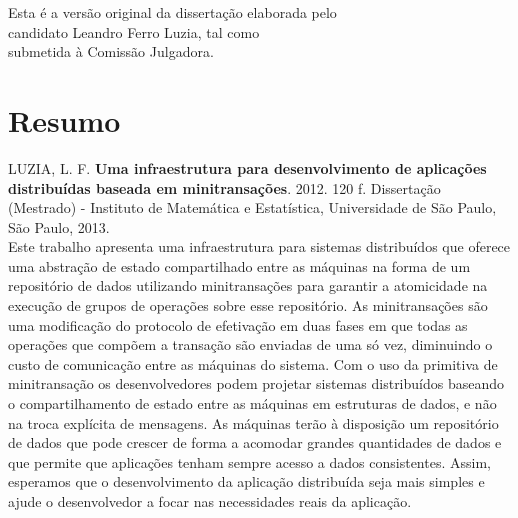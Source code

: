 \documentclass[11pt,twoside,a4paper]{book}
\begin{document}
    \vskip 2cm

    \begin{flushright}
	Esta é a versão original da dissertação elaborada pelo\\
	candidato Leandro Ferro Luzia, tal como \\
	submetida à Comissão Julgadora.
    \end{flushright}

\pagebreak



\chapter*{Resumo}

\noindent LUZIA, L. F. \textbf{Uma infraestrutura para desenvolvimento de aplicações distribuídas baseada em minitransações}. 
2012. 120 f.
Dissertação (Mestrado) - Instituto de Matemática e Estatística,
Universidade de São Paulo, São Paulo, 2013.
\\

Este trabalho apresenta uma infraestrutura para sistemas
distribuídos que oferece uma abstração de estado compartilhado entre as máquinas
na forma de um repositório de dados utilizando minitransações para garantir a atomicidade na execução de 
grupos de operações sobre esse repositório. As minitransações são uma modificação do protocolo de efetivação 
em duas fases em que todas as operações que compõem a transação são enviadas de
uma só vez, diminuindo o custo de comunicação entre as máquinas do sistema. Com o uso da primitiva de 
minitransação os desenvolvedores podem projetar sistemas distribuídos baseando o
compartilhamento de estado entre as máquinas em estruturas de dados, e não na troca explícita de mensagens. 
As máquinas terão à disposição um repositório de dados que pode crescer de forma a acomodar grandes 
quantidades de dados e que permite que aplicações tenham sempre acesso a dados
consistentes. Assim, esperamos que o desenvolvimento da aplicação distribuída seja mais simples e ajude o 
desenvolvedor a focar nas necessidades reais da aplicação.
\\
\end{document}
